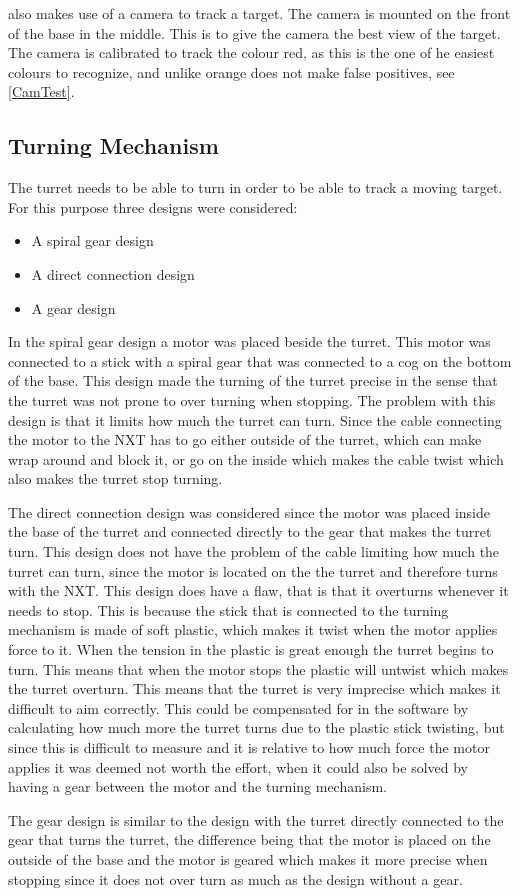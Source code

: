 \name also makes use of a camera to track a target. The camera is mounted on
the front of the base in the middle. This is to give the camera the best
view of the target. The camera is calibrated to track the colour red, as this is
the one of he easiest colours to recognize, and unlike orange does not make
false positives, see \autoref{CamTest}.

\subsection{Turning Mechanism}
The turret needs to be able to turn in order to be able to track a moving
target. For this purpose three designs were considered:

\begin{itemize}
  \item A spiral gear design
  \item A direct connection design
  \item A gear design
\end{itemize}

In the spiral gear design a motor was placed beside the turret. This motor was
connected to a stick with a spiral gear that was connected to a cog on the bottom
of the base. This design made the turning of the turret precise in the sense
that the turret was not prone to over turning when stopping. The
problem with this design is that it limits how much the turret can turn.
Since the cable connecting the motor to the NXT has to go either
outside of the turret, which can make wrap around and block it, or go on the
inside which makes the cable twist which also makes the turret stop turning.\nl

The direct connection design was considered since the motor was placed inside
the base of the turret and connected directly to the gear that makes the turret turn. This
design does not have the problem of the cable limiting how much the turret can
turn, since the motor is located on the the turret and therefore turns with the
NXT. This design does have a flaw, that is that it overturns whenever it needs
to stop. This is because the stick that is connected to the turning mechanism
is made of soft plastic, which makes it twist when the motor applies force to
it. When the tension in the plastic is great enough the turret begins to turn.
This means that when the motor stops the plastic will untwist which makes the
turret overturn. This means that the turret is very imprecise which makes it
difficult to aim correctly. This could be compensated for in the software by
calculating how much more the turret turns due to the plastic stick twisting,
but since this is difficult to measure and it is relative to how much force the motor applies it was deemed
not worth the effort, when it could also be solved by having a gear between
the motor and the turning mechanism.\nl

The gear design is similar to the design with the turret directly connected to
the gear that turns the turret, the difference being that the motor is placed on
the outside of the base and the motor is geared which makes it more precise when
stopping since it does not over turn as much as the design without a gear.
